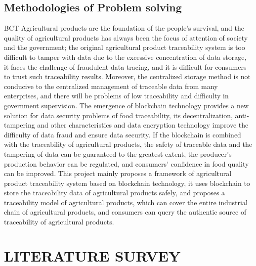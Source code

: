 \documentclass[oneside,a4paper,12pt]{report}
\begin{document}
\section{Methodologies of Problem solving}
BCT 
Agricultural products are the foundation of the people’s survival, and the quality of agricultural products has always been the focus of attention of society and the government; the original agricultural product traceability system is too difficult to tamper with data due to the excessive concentration of data storage, it faces the challenge of fraudulent data tracing, and it is difficult for consumers to trust such traceability results. Moreover, the centralized storage method is not conducive to the centralized management of traceable data from many enterprises, and there will be problems of low traceability and difficulty in government supervision. The emergence of blockchain technology provides a new solution for data security problems of food traceability, its decentralization, anti-tampering and other characteristics and data encryption technology improve the difficulty of data fraud and ensure data security. If the blockchain is combined with the traceability of agricultural products, the safety of traceable data and the tampering of data can be guaranteed to the greatest extent, the producer’s production behavior can be regulated, and consumers’ confidence in food quality can be improved. This project mainly proposes a framework of agricultural product traceability system based on blockchain technology, it uses blockchain to store the traceability data of agricultural products safely, and proposes a traceability model of agricultural products, which can cover the entire industrial chain of agricultural products, and consumers can query the authentic source of traceability of agricultural products.



\chapter{LITERATURE SURVEY}
\end{document}
